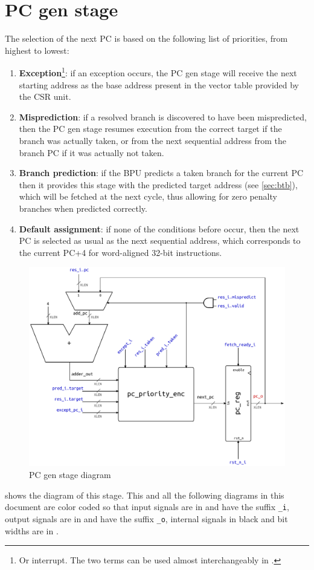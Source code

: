 \section{\acs{PC} gen stage}
The selection of the next \ac{PC} is based on the following list of priorities, from highest to lowest:
\begin{enumerate}
  \item \textbf{Exception}\footnote{Or interrupt. The two terms can be used almost interchangeably in \riscv.}: if an exception occurs, the \ac{PC} gen stage will receive the next starting address as the base address present in the vector table provided by the CSR unit.
  \item \textbf{Misprediction}: if a resolved branch is discovered to have been mispredicted, then the \ac{PC} gen stage resumes execution from the correct target if the branch was actually taken, or from the next sequential address from the branch \ac{PC} if it was actually not taken.
  \item \textbf{Branch prediction}: if the \ac{BPU} predicts a taken branch for the current \ac{PC} then it provides this stage with the predicted target address (see \cref{sec:btb}), which will be fetched at the next cycle, thus allowing for zero penalty branches when predicted correctly.
  \item \textbf{Default assignment}: if none of the conditions before occur, then the next \ac{PC} is selected as usual as the next sequential address, which corresponds to the current \ac{PC}+4 for word-aligned 32-bit instructions.
\end{enumerate}

\begin{figure}[hbt]
  \centering
  \includegraphics[width=\textwidth]{img/pc_gen_stage.pdf}
  \caption{\acs{PC} gen stage diagram}
  \label{fig:pc_gen_stage}
\end{figure}
 shows the diagram of this stage. This and all the following diagrams in this document are color coded so that input signals are in {\color{input_blue}{blue}} and have the suffix \texttt{\_i}, output signals are in {\color{output_red}{red}} and have the suffix \texttt{\_o}, internal signals in black and bit widths are in {\color{width_gray}{gray}}.

